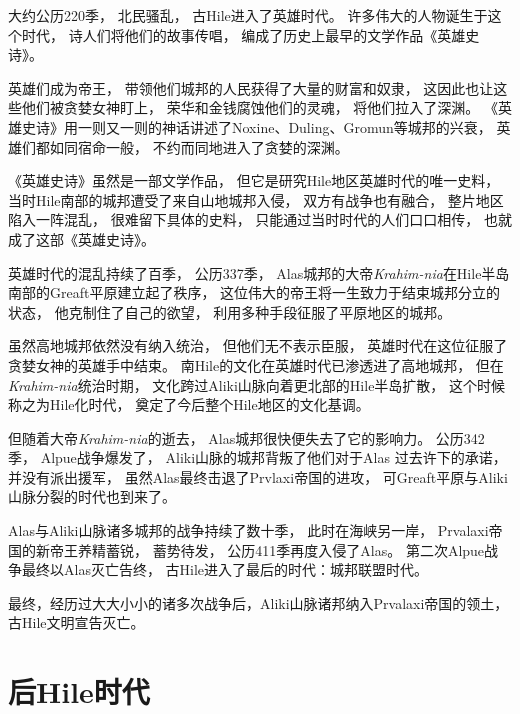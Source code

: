 \documentclass[UTF8,12pt,draft]{ctexbook}
\begin{document}
        大约公历220季，
        北民骚乱，
        古Hile进入了英雄时代。
        许多伟大的人物诞生于这个时代，
        诗人们将他们的故事传唱，
        编成了历史上最早的文学作品《英雄史诗》。

        英雄们成为帝王，
        带领他们城邦的人民获得了大量的财富和奴隶，
        这因此也让这些他们被贪婪女神盯上，
        荣华和金钱腐蚀他们的灵魂，
        将他们拉入了深渊。
        《英雄史诗》用一则又一则的神话讲述了Noxine、Duling、Gromun等城邦的兴衰，
        英雄们都如同宿命一般，
        不约而同地进入了贪婪的深渊。

        《英雄史诗》虽然是一部文学作品，
        但它是研究Hile地区英雄时代的唯一史料，
        当时Hile南部的城邦遭受了来自山地城邦入侵，
        双方有战争也有融合，
        整片地区陷入一阵混乱，
        很难留下具体的史料，
        只能通过当时时代的人们口口相传，
        也就成了这部《英雄史诗》。

        英雄时代的混乱持续了百季，
        公历337季，
        Alas城邦的大帝\emph{Krahim-nia}在Hile半岛南部的Greaft平原建立起了秩序，
        这位伟大的帝王将一生致力于结束城邦分立的状态，
        他克制住了自己的欲望，
        利用多种手段征服了平原地区的城邦。

        虽然高地城邦依然没有纳入统治，
        但他们无不表示臣服，
        英雄时代在这位征服了贪婪女神的英雄手中结束。
        南Hile的文化在英雄时代已渗透进了高地城邦，
        但在\emph{Krahim-nia}统治时期，
        文化跨过Aliki山脉向着更北部的Hile半岛扩散，
        这个时候称之为Hile化时代，
        奠定了今后整个Hile地区的文化基调。


        但随着大帝\emph{Krahim-nia}的逝去，
        Alas城邦很快便失去了它的影响力。
        公历342季，
        Alpue战争爆发了，
        Aliki山脉的城邦背叛了他们对于Alas
        过去许下的承诺，
        并没有派出援军，
        虽然Alas最终击退了Prvlaxi帝国的进攻，
        可Greaft平原与Aliki山脉分裂的时代也到来了。
        
        Alas与Aliki山脉诸多城邦的战争持续了数十季，
        此时在海峡另一岸，
        Prvalaxi帝国的新帝王养精蓄锐，
        蓄势待发，
        公历411季再度入侵了Alas。
        第二次Alpue战争最终以Alas灭亡告终，
        古Hile进入了最后的时代：城邦联盟时代。

        最终，经历过大大小小的诸多次战争后，Aliki山脉诸邦纳入Prvalaxi帝国的领土，
        古Hile文明宣告灭亡。
        \section{后Hile时代}
\end{document}
